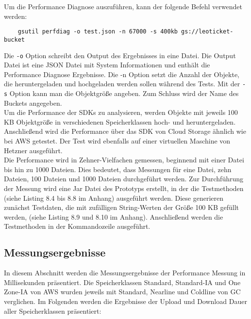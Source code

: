 Um die Performance Diagnose auszuführen, kann der folgende Befehl verwendet werden:

\begin{lstlisting}
	gsutil perfdiag -o test.json -n 67000 -s 400kb gs://leoticket-bucket
\end{lstlisting}

Die \verb|-o| Option schreibt den Output des Ergebnisses in eine Datei. Die Output Datei ist eine JSON Datei mit System Informationen und enthält die Performance Diagnose Ergebnisse. Die -n Option setzt die Anzahl der Objekte, die heruntergeladen und hochgeladen werden sollen während des Tests. Mit der \verb|-s| Option kann man die Objektgröße angeben. Zum Schluss wird der Name des Buckets angegeben.\\

Um die Performance der SDKs zu analysieren, werden Objekte mit jeweils 100 KB Objektgröße in verschiedenen Speicherklassen hoch- und heruntergeladen. Anschließend wird die Performance über das SDK von Cloud Storage ähnlich wie bei AWS getestet. Der Test wird ebenfalls auf einer virtuellen Maschine von Hetzner ausgeführt.\\

Die Performance wird in Zehner-Vielfachen gemessen, beginnend mit einer Datei bis hin zu 1000 Dateien. Dies bedeutet, dass Messungen für eine Datei, zehn Dateien, 100 Dateien und 1000 Dateien durchgeführt werden. Zur Durchführung der Messung wird eine Jar Datei des Prototyps erstellt, in der die Testmethoden (siehe Listing 8.4 bis 8.8 im Anhang) ausgeführt werden. Diese generieren zunächst Testdaten, die mit zufälligen String-Werten der Größe 100 KB gefüllt werden, (siehe Listing 8.9 und 8.10 im Anhang). Anschließend werden die Testmethoden in der Kommandozeile ausgeführt. 

\newpage

\subsection{Messungsergebnisse}

In diesem Abschnitt werden die Messungsergebnisse der Performance Messung in Millisekunden präsentiert. Die Speicherklassen Standard, Standard-IA und One Zone-IA von AWS wurden jeweils mit Standard, Nearline und Coldline von GC verglichen. Im Folgenden werden die Ergebnisse der Upload und Download Dauer aller Speicherklassen präsentiert: 

